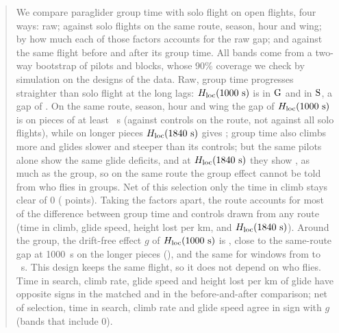 \begin{abstract}
\noindent
We compare paraglider group time with solo flight on open flights, four ways: raw; against solo flights on the
same route, season, hour and wing; by how much each of those factors accounts for the raw gap; and against the
same flight before and after its group time. All bands come from a two-way bootstrap of pilots and blocks, whose 90\% coverage we check by simulation on the designs of the data.
Raw, group time progresses straighter than solo flight at the long lags: $\Hk$ is \RawHKOneG{} in $\G$ and \RawHKOneS{} in $\Sl$, a gap of \RawGapHK{} \RawGapHKBand.
On the same route, season, hour and wing the gap of $\Hk$ is \MatDeltaHKG{} \MatDeltaHKGBand{} on pieces of at least \RawShortestOne~s (against controls on the route, not against all solo flights), while on longer pieces $\Hq$ gives \MatDeltaHQG{} \MatDeltaHQGBand; group time also climbs more and glides slower and steeper than its controls; but the same pilots alone show the same glide deficits, and at $\Hq$ they show \MatDeltaHQA{} \MatDeltaHQABand, as much as the group, so on the same route the group effect cannot be told from who flies in groups. Net of this selection only the time in climb stays clear of 0 (\MatDeltaClimbD{} \MatDeltaClimbDBand{} points).
Taking the factors apart, the route accounts for most of the difference between group time and controls drawn from any route (time in climb, glide speed, height lost per km, and $\Hq$). Around the group, the
drift-free effect $g$ of $\Hk$ is \PreGHK{} \PreGHKBand, close to the same-route gap at 1000~s on the longer pieces (\MatDeltaHKLongG), and the same for windows from \PreWinBLen{} to \PreWinDLen~s. This design keeps the same flight, so it does not depend on who flies. Time in search, climb rate, glide speed and height lost per km of glide have opposite signs in the matched and in the before-and-after comparison; net of selection, time in search, climb rate and glide speed agree in sign with $g$ (bands that include 0).
\end{abstract}
